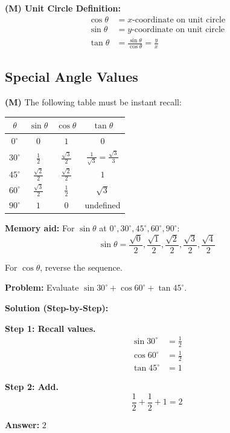 \documentclass[12pt]{extarticle}
\begin{document}
\begin{theorembox}
\textbf{(M) Unit Circle Definition:}
\begin{align*}
\cos\theta &= x\text{-coordinate on unit circle} \\
\sin\theta &= y\text{-coordinate on unit circle} \\
\tan\theta &= \frac{\sin\theta}{\cos\theta} = \frac{y}{x}
\end{align*}
\end{theorembox}

\subsection{Special Angle Values}

\begin{conceptbox}
\textbf{(M)} The following table must be instant recall:

\begin{center}
\begin{tabular}{|c|c|c|c|}
\hline
$\theta$ & $\sin\theta$ & $\cos\theta$ & $\tan\theta$ \\
\hline
$0^\circ$ & $0$ & $1$ & $0$ \\
$30^\circ$ & $\frac{1}{2}$ & $\frac{\sqrt{3}}{2}$ & $\frac{1}{\sqrt{3}} = \frac{\sqrt{3}}{3}$ \\
$45^\circ$ & $\frac{\sqrt{2}}{2}$ & $\frac{\sqrt{2}}{2}$ & $1$ \\
$60^\circ$ & $\frac{\sqrt{3}}{2}$ & $\frac{1}{2}$ & $\sqrt{3}$ \\
$90^\circ$ & $1$ & $0$ & undefined \\
\hline
\end{tabular}
\end{center}

\textbf{Memory aid:} For $\sin\theta$ at $0^\circ, 30^\circ, 45^\circ, 60^\circ, 90^\circ$:
\[
\sin\theta = \frac{\sqrt{0}}{2}, \frac{\sqrt{1}}{2}, \frac{\sqrt{2}}{2}, \frac{\sqrt{3}}{2}, \frac{\sqrt{4}}{2}
\]

For $\cos\theta$, reverse the sequence.
\end{conceptbox}

\begin{examplebox}
\textbf{Problem:} Evaluate $\sin 30^\circ + \cos 60^\circ + \tan 45^\circ$.

\textbf{Solution (Step-by-Step):}

\textbf{Step 1: Recall values.}
\begin{align*}
\sin 30^\circ &= \frac{1}{2} \\
\cos 60^\circ &= \frac{1}{2} \\
\tan 45^\circ &= 1
\end{align*}

\textbf{Step 2: Add.}
\[
\frac{1}{2} + \frac{1}{2} + 1 = 2
\]

\textbf{Answer:} $\boxed{2}$
\end{examplebox}
\end{document}
